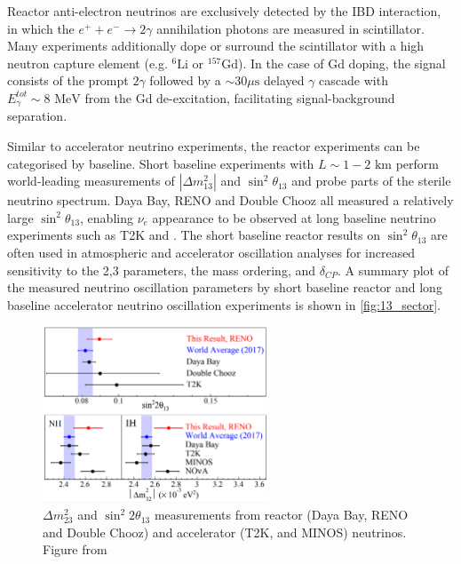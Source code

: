 Reactor anti-electron neutrinos are exclusively detected by the IBD interaction, in which the $e^+ + e^- \rightarrow 2\gamma$ annihilation photons are measured in scintillator. Many experiments additionally dope or surround the scintillator with a high neutron capture element (e.g. $^{6}\text{Li}$ or $^{157}\text{Gd}$). In the case of Gd doping, the signal consists of the prompt $2\gamma$ followed by a $\sim30\mu\text{s}$ delayed $\gamma$ cascade with $E_\gamma^{tot}\sim8\text{ MeV}$ from the Gd de-excitation, facilitating signal-background separation\cite{daya_bay,reno}.

Similar to accelerator neutrino experiments, the reactor experiments can be categorised by baseline. Short baseline experiments with $L\sim1-2\text{ km}$ perform world-leading measurements of $|\Delta m^2_{13}|$ and $\sin^2\theta_{13}$ and probe parts of the sterile neutrino spectrum. Daya Bay\cite{daya_bay_disc}, RENO\cite{reno_disc} and Double Chooz\cite{double_chooz} all measured a relatively large $\sin^2 \theta_{13}$, enabling $\nu_e$ appearance to be observed at long baseline neutrino experiments such as T2K and \nova. The short baseline reactor results on $\sin^2\theta_{13}$ are often used in atmospheric and accelerator oscillation analyses for increased sensitivity to the 2,3 parameters, the mass ordering, and $\delta_{CP}$. A summary plot of the measured neutrino oscillation parameters by short baseline reactor and long baseline accelerator neutrino oscillation experiments is shown in \autoref{fig:13_sector}.
\begin{figure}[h]
	\includegraphics[width=0.6\textwidth, trim={0mm 0mm 0mm 0mm}, clip,page=1]{figures/theory/reno_theta_dm13}
	\caption{$\Delta m^2_{23}$ and $\sin^2 2\theta_{13}$ measurements from reactor (Daya Bay\cite{daya_bay}, RENO\cite{reno_new} and Double Chooz\cite{double_chooz_old}) and accelerator (T2K\cite{t2k_2015}, \nova\cite{nova_2017} and MINOS\cite{minos_numu_nue}) neutrinos. Figure from \cite{reno_new}}
	\label{fig:13_sector}
\end{figure}

